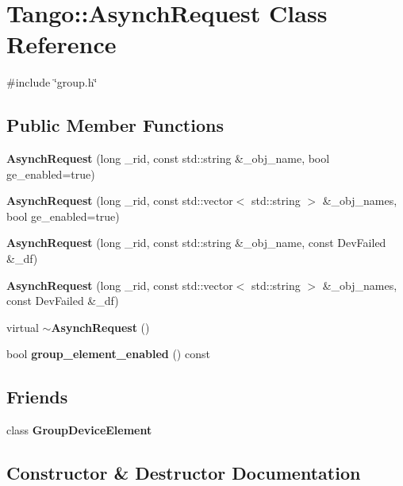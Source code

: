 \section{Tango\-:\-:Asynch\-Request Class Reference}
\label{classTango_1_1AsynchRequest}


{\ttfamily \#include \char`\"{}group.\-h\char`\"{}}

\subsection*{Public Member Functions}
\begin{DoxyCompactItemize}
\item 
{\bf Asynch\-Request} (long \-\_\-rid, const std\-::string \&\-\_\-obj\-\_\-name, bool ge\-\_\-enabled=true)
\item 
{\bf Asynch\-Request} (long \-\_\-rid, const std\-::vector$<$ std\-::string $>$ \&\-\_\-obj\-\_\-names, bool ge\-\_\-enabled=true)
\item 
{\bf Asynch\-Request} (long \-\_\-rid, const std\-::string \&\-\_\-obj\-\_\-name, const Dev\-Failed \&\-\_\-df)
\item 
{\bf Asynch\-Request} (long \-\_\-rid, const std\-::vector$<$ std\-::string $>$ \&\-\_\-obj\-\_\-names, const Dev\-Failed \&\-\_\-df)
\item 
virtual {\bf $\sim$\-Asynch\-Request} ()
\item 
bool {\bf group\-\_\-element\-\_\-enabled} () const 
\end{DoxyCompactItemize}
\subsection*{Friends}
\begin{DoxyCompactItemize}
\item 
class {\bf Group\-Device\-Element}
\end{DoxyCompactItemize}


\subsection{Constructor \& Destructor Documentation}
